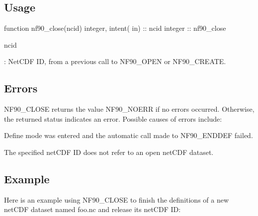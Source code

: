 \subsection*{Usage}


\begin{DoxyCode}
\textcolor{keyword}{function }nf90\_close(ncid)
  \textcolor{keywordtype}{integer}, \textcolor{keywordtype}{intent( in)} :: ncid
  \textcolor{keywordtype}{integer}              :: nf90\_close
\end{DoxyCode}


{\ttfamily ncid}

\+: Net\+C\+DF ID, from a previous call to N\+F90\+\_\+\+O\+P\+EN or N\+F90\+\_\+\+C\+R\+E\+A\+TE.

\subsection*{Errors}

N\+F90\+\_\+\+C\+L\+O\+SE returns the value N\+F90\+\_\+\+N\+O\+E\+RR if no errors occurred. Otherwise, the returned status indicates an error. Possible causes of errors include\+:


\begin{DoxyItemize}
\item Define mode was entered and the automatic call made to N\+F90\+\_\+\+E\+N\+D\+D\+EF failed.
\item The specified net\+C\+DF ID does not refer to an open net\+C\+DF dataset.
\end{DoxyItemize}

\subsection*{Example}

Here is an example using N\+F90\+\_\+\+C\+L\+O\+SE to finish the definitions of a new net\+C\+DF dataset named foo.\+nc and release its net\+C\+DF ID\+:


